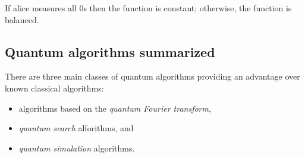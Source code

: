 If alice measures all \num{0}s then the function is constant; otherwise, the function is balanced.

\subsection{Quantum algorithms summarized}
There are three main classes of quantum algorithms providing an advantage over known classical algorithms:
\begin{itemize}
    \item algorithms based on the \emph{quantum Fourier transform},
    \item \emph{quantum search} alforithms, and
    \item \emph{quantum simulation} algorithms.
\end{itemize}
